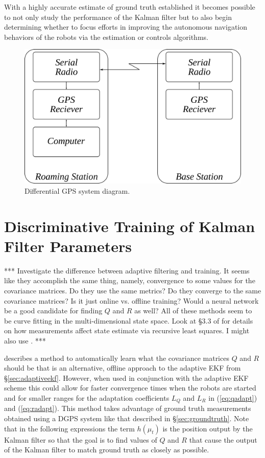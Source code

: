 With a highly accurate estimate of ground truth established it becomes possible to not only study the performance of the Kalman filter but to also begin determining whether to focus efforts in improving the autonomous navigation behaviors of the robots via the estimation or controls algorithms.

\begin{figure}[ht!]
	\centering
	\includegraphics[width=.6\textwidth]{images/dgps}
	\caption{Differential GPS system diagram.}
	\label{fig:dgps}
\end{figure}

\section{Discriminative Training of Kalman Filter Parameters}
\label{sec:trainingkfparams}
*** Investigate the difference between adaptive filtering and training. It seems like they accomplish the same thing, namely, convergence to some values for the covariance matrices. Do they use the same metrics? Do they converge to the same covariance matrices? Is it just online vs. offline training? Would a neural network be a good candidate for finding $Q$ and $R$ as well? All of these methods seem to be curve fitting in the multi-dimensional state space. Look at \S3.3 of \cite{Simon06OptimalEstimation} for details on how measurements affect state estimate via recursive least squares. I might also use \cite{Orderud05}. ***

\cite{Abbeel-RSS-05} describes a method to automatically learn what the covariance matrices $Q$ and $R$ should be that is an alternative, offline approach to the adaptive EKF from \S\ref{sec:adaptiveekf}. However, when used in conjunction with the adaptive EKF scheme this could allow for faster convergence times when the robots are started and for smaller ranges for the adaptation coefficients $L_Q$ and $L_R$ in (\ref{eq:qadapt}) and (\ref{eq:radapt}). This method takes advantage of ground truth measurements obtained using a DGPS system like that described in \S\ref{sec:groundtruth}. Note that in the following expressions the term $h(\mu_t)$ is the position output by the Kalman filter so that the goal is to find values of $Q$ and $R$ that cause the output of the Kalman filter to match ground truth as closely as possible.

